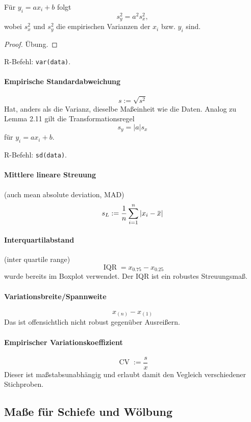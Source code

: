 \begin{lem}[Transformationsregel] %
  Für $y_i = a x_i + b$ folgt
  \[ s_y^2 = a^2 s_x^2, \]
  wobei $s_x^2$ und $s_y^2$ die empirischen Varianzen der $x_i$ bzw. $y_i$ sind.
\end{lem}

\begin{proof}
  Übung.
\end{proof}

R-Befehl: \verb+var(data)+.

\paragraph{Empirische Standardabweichung}
\[ s := \sqrt{s^2} \]
Hat, anders als die Varianz, dieselbe Maßeinheit wie die Daten. Analog zu Lemma
2.11 gilt die Transformationsregel
\[ s_y = |a| s_x \]
für $y_i = a x_i + b$.

R-Befehl: \verb+sd(data)+.

\paragraph{Mittlere lineare Streuung}
(auch mean absolute deviation, MAD)
\[ s_L := \rez{n} \sum_{i=1}^n | x_i - \obar{x} | \]

\paragraph{Interquartilabstand}
(inter quartile range)
\[ \operatorname{IQR} = x_{0.75} - x_{0.25} \]
wurde bereits im Boxplot verwendet. Der IQR ist ein robustes Streuungsmaß.

\paragraph{Variationsbreite/Spannweite}
\[ x_{(n)} - x_{(1)} \]
Das ist offensichtlich nicht robust gegenüber Ausreißern.

\paragraph{Empirischer Variationskoeffizient}
\[ \operatorname{CV} := \frac{s}{x} \]
Dieser ist maßstabsunabhängig und erlaubt damit den Vegleich verschiedener
Stichproben.

\subsection{Maße für Schiefe und Wölbung}
